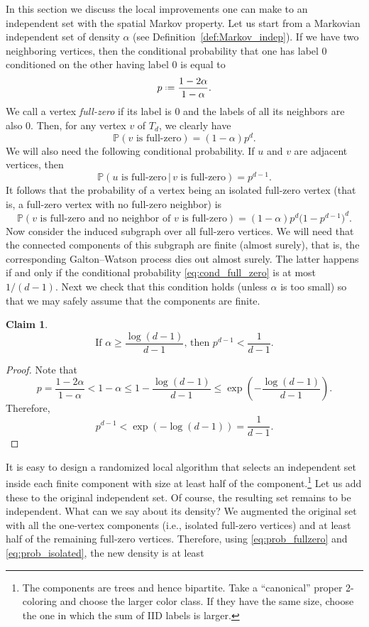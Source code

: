 \documentclass[12pt]{amsart}
\newtheorem{claim}[theorem]{Claim}
\theoremstyle{definition}
\newcommand\Pb{\mathbb{P}}  %
\newcommand\al{\alpha}
\newcommand{\defeq}{\mathrel{\vcenter{\baselineskip0.5ex \lineskiplimit0pt
                     \hbox{\scriptsize.}\hbox{\scriptsize.}}}%
                     =}
\begin{document}
In this section we discuss the local improvements one can make to an independent set with the spatial Markov property. Let us start from a Markovian independent set of density $\al$ (see Definition~\ref{def:Markov_indep}). If we have two neighboring vertices, then the conditional probability that one has label $0$ conditioned on the other having label $0$ is equal to 
%
\[ p \defeq \frac{1-2\al}{1-\al} .\]
%
We call a vertex \emph{full-zero} if its label is $0$ and the labels of all its neighbors are also $0$. Then, for any vertex $v$ of $T_d$, we clearly have
%
\begin{equation} \label{eq:prob_fullzero}
\Pb( v \text{ is full-zero} ) 
= (1-\al) p^d .
\end{equation}
%
We will also need the following conditional probability. If $u$ and $v$ are adjacent vertices, then 
%
\begin{equation} \label{eq:cond_full_zero}
\Pb( u \text{ is full-zero} \, | \, v \text{ is full-zero} ) 
= p^{d-1} .
\end{equation}
%
It follows that the probability of a vertex being an isolated full-zero vertex (that is, a full-zero vertex with no full-zero neighbor) is
%
\begin{equation} \label{eq:prob_isolated}
\Pb( v \text{ is full-zero and no neighbor of $v$ is full-zero} )
= (1-\al) p^d \big( 1- p^{d-1} \big)^d .
\end{equation}
%
Now consider the induced subgraph over all full-zero vertices. We will need that the connected components of this subgraph are finite (almost surely), that is, the corresponding Galton--Watson process dies out almost surely. The latter happens if and only if the conditional probability \eqref{eq:cond_full_zero} is at most $1/(d-1)$. Next we check that this condition holds (unless $\al$ is too small) so that we may safely assume that the components are finite.
%
\begin{claim} \label{cl:p_bnd}
\[ \text{If } 
\al \geq \frac{\log(d-1)}{d-1}
\text{, then }
p^{d-1} < \frac{1}{d-1} .\]
\end{claim}
%
\begin{proof}
Note that 
%
\[ p = \frac{1-2\al}{1-\al} < 1-\al \leq 1 - \frac{\log(d-1)}{d-1} 
\leq \exp\left( - \frac{\log(d-1)}{d-1} \right).\]
%
Therefore, 
\[ p^{d-1} < \exp\left( - \log(d-1) \right) = \frac{1}{d-1} .\]    
\end{proof}
%
It is easy to design a randomized local algorithm that selects an independent set inside each finite component with size at least half of the component.\footnote{The components are trees and hence bipartite. Take a ``canonical'' proper 2-coloring and choose the larger color class. If they have the same size, choose the one in which the sum of IID labels is larger.} Let us add these to the original independent set. Of course, the resulting set remains to be independent. What can we say about its density? We augmented the original set with all the one-vertex components (i.e., isolated full-zero vertices) and at least half of the remaining full-zero vertices. Therefore, using \eqref{eq:prob_fullzero} and \eqref{eq:prob_isolated}, the new density is at least 
\end{document}

